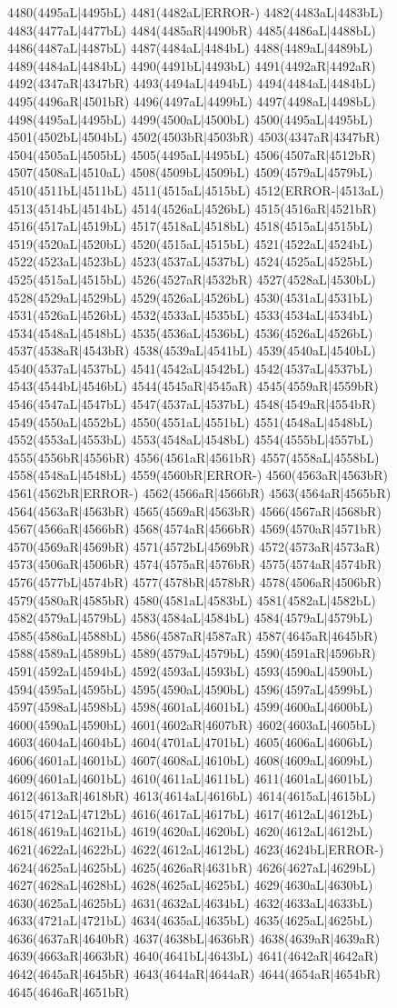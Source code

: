 4480(4495aL|4495bL) 4481(4482aL|ERROR-) 4482(4483aL|4483bL) 4483(4477aL|4477bL) 4484(4485aR|4490bR) 4485(4486aL|4488bL) 4486(4487aL|4487bL) 4487(4484aL|4484bL) 4488(4489aL|4489bL) 4489(4484aL|4484bL) 4490(4491bL|4493bL) 4491(4492aR|4492aR) 4492(4347aR|4347bR) 4493(4494aL|4494bL) 4494(4484aL|4484bL) 4495(4496aR|4501bR) 4496(4497aL|4499bL) 4497(4498aL|4498bL) 4498(4495aL|4495bL) 4499(4500aL|4500bL) 4500(4495aL|4495bL) 4501(4502bL|4504bL) 4502(4503bR|4503bR) 4503(4347aR|4347bR) 4504(4505aL|4505bL) 4505(4495aL|4495bL) 4506(4507aR|4512bR) 4507(4508aL|4510aL) 4508(4509bL|4509bL) 4509(4579aL|4579bL) 4510(4511bL|4511bL) 4511(4515aL|4515bL) 4512(ERROR-|4513aL) 4513(4514bL|4514bL) 4514(4526aL|4526bL) 4515(4516aR|4521bR) 4516(4517aL|4519bL) 4517(4518aL|4518bL) 4518(4515aL|4515bL) 4519(4520aL|4520bL) 4520(4515aL|4515bL) 4521(4522aL|4524bL) 4522(4523aL|4523bL) 4523(4537aL|4537bL) 4524(4525aL|4525bL) 4525(4515aL|4515bL) 4526(4527aR|4532bR) 4527(4528aL|4530bL) 4528(4529aL|4529bL) 4529(4526aL|4526bL) 4530(4531aL|4531bL) 4531(4526aL|4526bL) 4532(4533aL|4535bL) 4533(4534aL|4534bL) 4534(4548aL|4548bL) 4535(4536aL|4536bL) 4536(4526aL|4526bL) 4537(4538aR|4543bR) 4538(4539aL|4541bL) 4539(4540aL|4540bL) 4540(4537aL|4537bL) 4541(4542aL|4542bL) 4542(4537aL|4537bL) 4543(4544bL|4546bL) 4544(4545aR|4545aR) 4545(4559aR|4559bR) 4546(4547aL|4547bL) 4547(4537aL|4537bL) 4548(4549aR|4554bR) 4549(4550aL|4552bL) 4550(4551aL|4551bL) 4551(4548aL|4548bL) 4552(4553aL|4553bL) 4553(4548aL|4548bL) 4554(4555bL|4557bL) 4555(4556bR|4556bR) 4556(4561aR|4561bR) 4557(4558aL|4558bL) 4558(4548aL|4548bL) 4559(4560bR|ERROR-) 4560(4563aR|4563bR) 4561(4562bR|ERROR-) 4562(4566aR|4566bR) 4563(4564aR|4565bR) 4564(4563aR|4563bR) 4565(4569aR|4563bR) 4566(4567aR|4568bR) 4567(4566aR|4566bR) 4568(4574aR|4566bR) 4569(4570aR|4571bR) 4570(4569aR|4569bR) 4571(4572bL|4569bR) 4572(4573aR|4573aR) 4573(4506aR|4506bR) 4574(4575aR|4576bR) 4575(4574aR|4574bR) 4576(4577bL|4574bR) 4577(4578bR|4578bR) 4578(4506aR|4506bR) 4579(4580aR|4585bR) 4580(4581aL|4583bL) 4581(4582aL|4582bL) 4582(4579aL|4579bL) 4583(4584aL|4584bL) 4584(4579aL|4579bL) 4585(4586aL|4588bL) 4586(4587aR|4587aR) 4587(4645aR|4645bR) 4588(4589aL|4589bL) 4589(4579aL|4579bL) 4590(4591aR|4596bR) 4591(4592aL|4594bL) 4592(4593aL|4593bL) 4593(4590aL|4590bL) 4594(4595aL|4595bL) 4595(4590aL|4590bL) 4596(4597aL|4599bL) 4597(4598aL|4598bL) 4598(4601aL|4601bL) 4599(4600aL|4600bL) 4600(4590aL|4590bL) 4601(4602aR|4607bR) 4602(4603aL|4605bL) 4603(4604aL|4604bL) 4604(4701aL|4701bL) 4605(4606aL|4606bL) 4606(4601aL|4601bL) 4607(4608aL|4610bL) 4608(4609aL|4609bL) 4609(4601aL|4601bL) 4610(4611aL|4611bL) 4611(4601aL|4601bL) 4612(4613aR|4618bR) 4613(4614aL|4616bL) 4614(4615aL|4615bL) 4615(4712aL|4712bL) 4616(4617aL|4617bL) 4617(4612aL|4612bL) 4618(4619aL|4621bL) 4619(4620aL|4620bL) 4620(4612aL|4612bL) 4621(4622aL|4622bL) 4622(4612aL|4612bL) 4623(4624bL|ERROR-) 4624(4625aL|4625bL) 4625(4626aR|4631bR) 4626(4627aL|4629bL) 4627(4628aL|4628bL) 4628(4625aL|4625bL) 4629(4630aL|4630bL) 4630(4625aL|4625bL) 4631(4632aL|4634bL) 4632(4633aL|4633bL) 4633(4721aL|4721bL) 4634(4635aL|4635bL) 4635(4625aL|4625bL) 4636(4637aR|4640bR) 4637(4638bL|4636bR) 4638(4639aR|4639aR) 4639(4663aR|4663bR) 4640(4641bL|4643bL) 4641(4642aR|4642aR) 4642(4645aR|4645bR) 4643(4644aR|4644aR) 4644(4654aR|4654bR) 4645(4646aR|4651bR) 